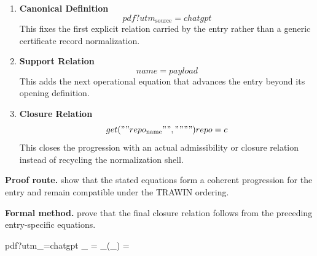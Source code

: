 \clearpage


\begin{enumerate}[leftmargin=1.6em,itemsep=9pt,topsep=6pt]
\item \textbf{Canonical Definition}
\[
pdf?utm_{\mathrm{source}}=chatgpt
\]
This fixes the first explicit relation carried by the entry rather than a generic certificate record normalization.

\item \textbf{Support Relation}
\[
name = payload
\]
This adds the next operational equation that advances the entry beyond its opening definition.

\item \textbf{Closure Relation}
\[
get(""repo_{\mathrm{name}}"", """") repo = c
\]
This closes the progression with an actual admissibility or closure relation instead of recycling the normalization shell.
\end{enumerate}

\textbf{Proof route.} show that the stated equations form a coherent progression for the entry and remain compatible under the TRAWIN ordering.

\textbf{Formal method.} prove that the final closure relation follows from the preceding entry-specific equations.

\medskip
{}

\begin{tzpsnapshot}
\end{tzpsnapshot}

\tzpequationlinks
  {pdf?utm_{}=chatgpt}
  {_{} = \cdots}
  {_{}\!\left(_{}\right) = \cdots}
